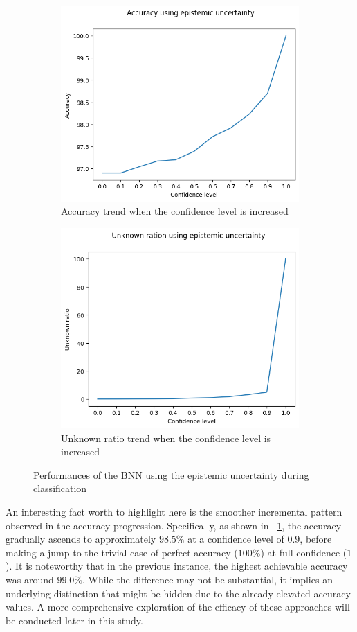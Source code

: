 \begin{figure}[h]
	\centering
	\begin{subfigure}{.5\textwidth}
		\centering
		\includegraphics[width=0.8\linewidth]{ImageFiles/ClassifUncer/epistemic_acc}
		\caption{Accuracy trend when the confidence level is increased}
		\label{fig:epistemic_acc}
	\end{subfigure}%
	\begin{subfigure}{.5\textwidth}
		\centering
		\includegraphics[width=0.8\linewidth]{ImageFiles/ClassifUncer/epistemic_unk}
		\caption{Unknown ratio trend when the confidence level is increased}
		\label{fig:epistemic_unk}
	\end{subfigure}
	\caption{Performances of the BNN using the epistemic uncertainty during classification}
	\label{fig:epistemic_class}
\end{figure}

An interesting fact worth to highlight here is the smoother incremental pattern observed in the accuracy progression. Specifically, as shown in \Fig~\ref{fig:epistemic_acc}, the accuracy gradually ascends to approximately $98.5\%$ at a confidence level of $0.9$, before making a jump to the trivial case of perfect accuracy ($100\%$) at full confidence ($1$). It is noteworthy that in the previous instance, the highest achievable accuracy was around $99.0\%$. While the difference may not be substantial, it implies an underlying distinction that might be hidden due to the already elevated accuracy values. A more comprehensive exploration of the efficacy of these approaches will be conducted later in this study.